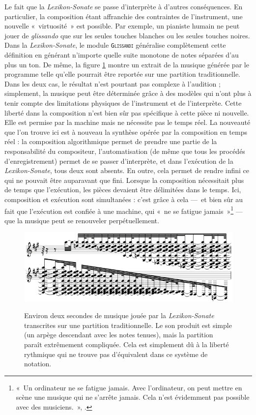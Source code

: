 \documentclass[a4paper,12pt]{article}
\newcommand{\guill}[1]{«~#1~»}
\begin{document}
Le fait que la \emph{Lexikon-Sonate} se passe d'interprète à d'autres conséquences. En particulier, la composition étant affranchie des contraintes de l'instrument, une nouvelle \guill{virtuosité} est possible. Par exemple, un pianiste humain ne peut jouer de \emph{glissando} que sur les seules touches blanches ou les seules touches noires. Dans la \emph{Lexikon-Sonate}, le module \texttt{\textsc{Glissandi}} généralise complètement cette définition en générant n'importe quelle suite monotone de notes séparées d'au plus un ton. De même, la figure \ref{partitionls} montre un extrait de la musique générée par le programme telle qu'elle pourrait être reportée sur une partition traditionnelle. Dans les deux cas, le résultat n'est pourtant pas complexe à l'audition ; simplement, la musique peut être déterminée grâce à des modèles qui n'ont plus à tenir compte des limitations physiques de l'instrument et de l'interprète. Cette liberté dans la composition n'est bien sûr pas spécifique à cette pièce ni nouvelle. Elle est permise par la machine mais ne nécessite pas le temps réel. La nouveauté que l'on trouve ici est à nouveau la synthèse opérée par la composition en temps réel : la composition algorithmique permet de prendre une partie de la responsabilité du compositeur, l'automatisation (de même que tous les procédés d'enregistrement) permet de se passer d'interprète, et dans l'exécution de la \emph{Lexikon-Sonate}, tous deux sont absents. En outre, cela permet de rendre infini ce qui ne pouvait être auparavant que fini. Lorsque la composition nécessitait plus de temps que l'exécution, les pièces devaient être délimitées dans le temps. Ici, composition et exécution sont simultanées : c'est grâce à cela ---~et bien sûr au fait que l'exécution est confiée à une machine, qui \guill{ne se fatigue jamais}\footnote{\guill{Un ordinateur ne se fatigue jamais. Avec l'ordinateur, on peut mettre en scène une musique qui ne s'arrête jamais. Cela n'est évidemment pas possible avec des musiciens.}, \cite{pagano}.} --- que la musique peut se renouveler perpétuellement.

\begin{figure}[h!]
\begin{center}
\includegraphics[width=12cm]{images/partitionls.png}
\label{partitionls}
\caption{\footnotesize Environ deux secondes de musique jouée par la \emph{Lexikon-Sonate} transcrites sur une partition traditionnelle. Le son produit est simple (un arpège descendant avec les notes tenues), mais la partition paraît extrêmement compliquée. Cela est simplement dû à la liberté rythmique qui ne trouve pas d'équivalent dans ce système de notation.}
\end{center}
\end{figure}
\end{document}
